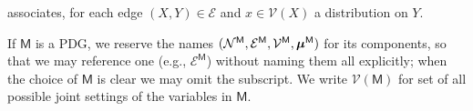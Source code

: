 \documentclass{article}
\newcommand{\bmu}{\boldsymbol{\mu}}
\newcommand{\V}{\mathcal V}
\newcommand{\Ed}{\mathcal E}
\newcommand{\sfM}{\mathsf M}
\newcommand{\MN}{PDG}
\numberwithin{equation}{section}
\begin{document}
\begin{defn}[\MN]
\begin{description}[nosep]
			  associates, for each edge $(X,Y) \in
                          \Ed$ and $x \in \V(X)$ a distribution on $Y$. 

		\end{description}
	\end{defn}
	If $\sfM$ is a \MN, we reserve the names $\mnvars[^\sfM]$ for its components, so that we may reference one (e.g., $\Ed^\sfM$) without naming them all explicitly; when the choice of $\sfM$ is clear we may omit the subscript.
	We write $\V(\sfM)$ for set of all possible joint settings of the variables in $\sfM$. 
\end{document}
